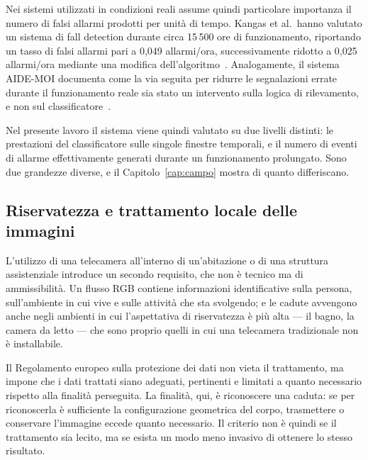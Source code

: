 Nei sistemi utilizzati in condizioni reali assume quindi particolare
importanza il numero di falsi allarmi prodotti per unità di tempo. Kangas et
al.\ hanno valutato un sistema di fall detection durante circa 15\,500 ore di
funzionamento, riportando un tasso di falsi allarmi pari a 0,049
allarmi/ora, successivamente ridotto a 0,025 allarmi/ora mediante una
modifica dell'algoritmo~\cite{kangas}. Analogamente, il sistema AIDE-MOI
documenta come la via seguita per ridurre le segnalazioni errate durante il
funzionamento reale sia stato un intervento sulla logica di rilevamento, e
non sul classificatore~\cite{aidemoi}.

Nel presente lavoro il sistema viene quindi valutato su due livelli distinti:
le prestazioni del classificatore sulle singole finestre temporali, e il
numero di eventi di allarme effettivamente generati durante un funzionamento
prolungato. Sono due grandezze diverse, e il Capitolo~\ref{cap:campo} mostra
di quanto differiscano.

\subsection{Riservatezza e trattamento locale delle immagini}


L'utilizzo di una telecamera all'interno di un'abitazione o di una struttura
assistenziale introduce un secondo requisito, che non è tecnico ma di
ammissibilità. Un flusso RGB contiene informazioni identificative sulla
persona, sull'ambiente in cui vive e sulle attività che sta svolgendo; e le
cadute avvengono anche negli ambienti in cui l'aspettativa di riservatezza è
più alta --- il bagno, la camera da letto --- che sono proprio quelli in cui
una telecamera tradizionale non è installabile.

Il Regolamento europeo sulla protezione dei dati non vieta il trattamento, ma
impone che i dati trattati siano adeguati, pertinenti e limitati a quanto
necessario rispetto alla finalità perseguita. La finalità, qui, è riconoscere
una caduta: se per riconoscerla è sufficiente la configurazione geometrica del
corpo, trasmettere o conservare l'immagine eccede quanto necessario. Il
criterio non è quindi se il trattamento sia lecito, ma se esista un modo meno
invasivo di ottenere lo stesso risultato.


